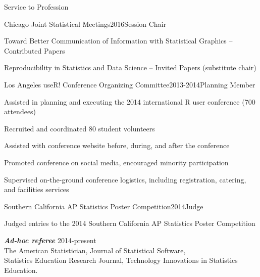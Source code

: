 \documentclass{resume} %
\begin{document}
\begin{rSection}{Service to Profession}

\begin{rSubsection}{Chicago Joint Statistical Meetings}{}{2016}{Session Chair}
\item Toward Better Communication of Information with Statistical Graphics -- Contributed Papers
\item Reproducibility in Statistics and Data Science -- Invited Papers (substitute chair)
\end{rSubsection}



\begin{rSubsection}{Los Angeles useR! Conference Organizing Committee}{}{2013-2014}{Planning Member}
\item Assisted in planning and executing the 2014 international R user conference (700 attendees)
\item Recruited and coordinated 80 student volunteers
\item Assisted with conference website before, during, and after the conference
\item Promoted conference on social media, encouraged minority participation
\item Supervised on-the-ground conference logistics, including registration, catering, and facilities services
\end{rSubsection}



\begin{rSubsection}{Southern California AP Statistics Poster Competition}{}{2014}{Judge}
\item Judged entries to the 2014 Southern California AP Statistics Poster Competition
\end{rSubsection}



{\em \bf Ad-hoc referee }\hfill {2014-present} \\
The American Statistician, Journal of Statistical Software, \\ Statistics Education Research Journal, Technology Innovations in Statistics Education.



\end{rSection}
\end{document}
